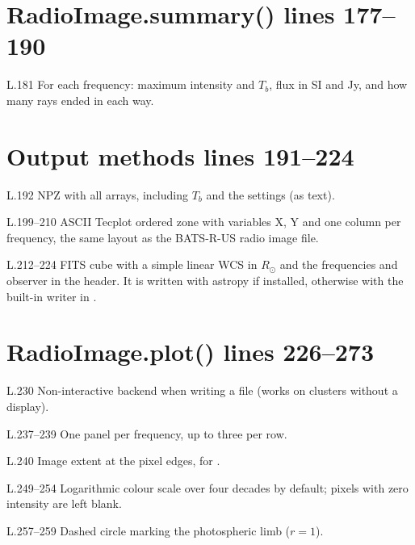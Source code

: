 \section*{\normalsize RadioImage.summary() \hfill{\small\mdseries\color{gray}lines 177--190}}

\begin{lines}
\item[L.181] For each frequency: maximum intensity and $T_b$, flux in SI and Jy, and how many rays ended in each way.
\end{lines}
\section*{\normalsize Output methods \hfill{\small\mdseries\color{gray}lines 191--224}}

\begin{lines}
\item[L.192] NPZ with all arrays, including $T_b$ and the settings (as text).
\item[L.199–210] ASCII Tecplot ordered zone with variables X, Y and one column per frequency, the same layout as the BATS-R-US radio image file.
\item[L.212–224] FITS cube with a simple linear WCS in $R_\odot$ and the frequencies and observer in the header. It is written with astropy if installed, otherwise with the built-in writer in .
\end{lines}
\section*{\normalsize RadioImage.plot() \hfill{\small\mdseries\color{gray}lines 226--273}}

\begin{lines}
\item[L.230] Non-interactive backend when writing a file (works on clusters without a display).
\item[L.237–239] One panel per frequency, up to three per row.
\item[L.240] Image extent at the pixel edges, for .
\item[L.249–254] Logarithmic colour scale over four decades by default; pixels with zero intensity are left blank.
\item[L.257–259] Dashed circle marking the photospheric limb ($r=1$).
\end{lines}
